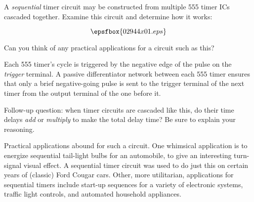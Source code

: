

A {\it sequential} timer circuit may be constructed from multiple 555 timer ICs cascaded together.  Examine this circuit and determine how it works:

$$\epsfbox{02944x01.eps}$$

Can you think of any practical applications for a circuit such as this?







Each 555 timer's cycle is triggered by the negative edge of the pulse on the {\it trigger} terminal.  A passive differentiator network between each 555 timer ensures that only a brief negative-going pulse is sent to the trigger terminal of the next timer from the output terminal of the one before it.

\vskip 10pt

Follow-up question: when timer circuits are cascaded like this, do their time delays {\it add} or {\it multiply} to make the total delay time?  Be sure to explain your reasoning.







Practical applications abound for such a circuit.  One whimsical application is to energize sequential tail-light bulbs for an automobile, to give an interesting turn-signal visual effect.  A sequential timer circuit was used to do just this on certain years of (classic) Ford Cougar cars.  Other, more utilitarian, applications for sequential timers include start-up sequences for a variety of electronic systems, traffic light controls, and automated household appliances.




